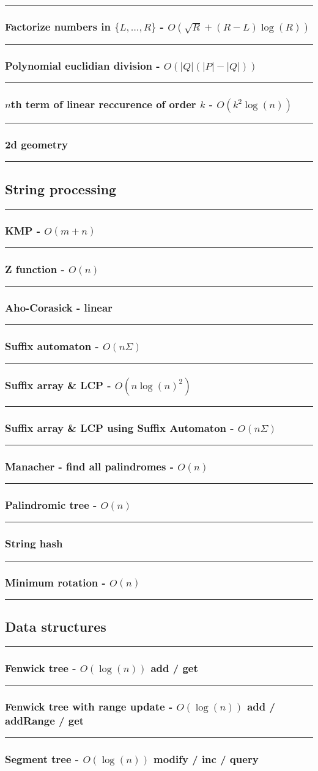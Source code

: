 \documentclass[landscape,a4paper,twocolumn,10pt]{report}
\renewcommand{\line}{\noindent\rule{\linewidth}{1pt}}
\newcommand{\algosection}[1]{\line \subsection*{#1}}
\newcommand{\algorithm}[1]{\line \subsubsection*{#1}}
\begin{document}
\algorithm{Factorize numbers in $\{L, \dots, R\}$ - $O(\sqrt{R} + (R-L) \log(R))$}


\algorithm{Polynomial euclidian division - $O(|Q|(|P|-|Q|))$}


\algorithm{$n$th term of linear reccurence of order $k$ - $O(k^2 \log(n))$}


\algorithm{2d geometry}


\algosection{String processing}
\label{string}

\algorithm{KMP - $O(m+n)$}


\algorithm{Z function - $O(n)$}


\algorithm{Aho-Corasick - linear}


\algorithm{Suffix automaton - $O(n \Sigma)$}


\algorithm{Suffix array \& LCP - $O(n \log(n)^2)$}


\algorithm{Suffix array \& LCP using Suffix Automaton - $O(n \Sigma)$}


\algorithm{Manacher - find all palindromes - $O(n)$}


\algorithm{Palindromic tree - $O(n)$}


\algorithm{String hash}


\algorithm{Minimum rotation - $O(n)$}


\algosection{Data structures}
\label{datastruct}

%

\algorithm{Fenwick tree - $O(\log(n))$ add / get}


\algorithm{Fenwick tree with range update - $O(\log(n))$ add / addRange / get}


\algorithm{Segment tree - $O(\log(n))$ modify / inc / query}

\end{document}
